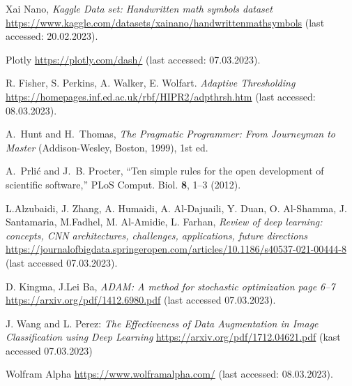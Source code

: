 \documentclass[@CLASSOPTIONS@]{tumarticle}
\begin{document}
\begin{thebibliography}{10}
  \newcommand{\enquote}[1]{``#1''}

  Xai Nano, \emph{Kaggle Data set: Handwritten math symbols dataset}
  \url{https://www.kaggle.com/datasets/xainano/handwrittenmathsymbols}
  (last accessed: 20.02.2023).

  Plotly \url{https://plotly.com/dash/}
  (last accessed: 07.03.2023).

  R. Fisher, S. Perkins, A. Walker, E. Wolfart.
  \emph{Adaptive Thresholding}
  \url{https://homepages.inf.ed.ac.uk/rbf/HIPR2/adpthrsh.htm}
  (last accessed: 08.03.2023).

  A.~Hunt and H.~Thomas, \emph{The Pragmatic Programmer: From Journeyman to
    Master} (Addison-Wesley, Boston, 1999), 1st ed.

  A.~Prli{\'c} and J.~B. Procter, \enquote{Ten simple rules for the open
    development of scientific software,} PLoS Comput. Biol. \textbf{8}, 1--3
  (2012).

  L.Alzubaidi, J. Zhang, A. Humaidi, A. Al-Dajuaili, Y. Duan, O. Al-Shamma, J. Santamaria, M.Fadhel, M. Al-Amidie, L. Farhan,
    \emph{Review of deep learning: concepts, CNN architectures, challenges, applications, future directions}
    \url{https://journalofbigdata.springeropen.com/articles/10.1186/s40537-021-00444-8}
    (last accessed 07.03.2023).

  D. Kingma, J.Lei Ba, \emph{ADAM: A method for stochastic optimization page 6--7}
    \url{https://arxiv.org/pdf/1412.6980.pdf}
        (last accessed 07.03.2023).

  J. Wang and L. Perez: \emph{The Effectiveness of Data Augmentation in Image Classification using Deep Learning}
    \url{https://arxiv.org/pdf/1712.04621.pdf}
    (kast accessed 07.03.2023)

  Wolfram Alpha \url{https://www.wolframalpha.com/}
  (last accessed: 08.03.2023).



\end{thebibliography}
\end{document}
